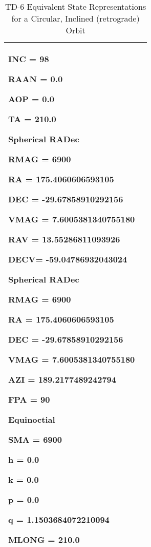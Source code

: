 \begin{table}[htbp!]
\begin{tabular}{|p{1.0 in} |p{5.0 in} |}
\begin{compactenum}
\begin{compactenum}
                  \item INC = 98
                  \item RAAN = 0.0
                  \item AOP = 0.0
                  \item TA = 210.0
              \end{compactenum}
              \item Spherical RADec
               \begin{compactenum}
                  \item RMAG = 6900
                  \item RA = 175.4060606593105
                  \item DEC = -29.67858910292156
                  \item VMAG = 7.6005381340755180
                  \item RAV = 13.55286811093926
                  \item DECV= -59.04786932043024
              \end{compactenum}
              \item Spherical RADec
               \begin{compactenum}
                  \item RMAG = 6900
                  \item RA = 175.4060606593105
                  \item DEC = -29.67858910292156
                  \item VMAG = 7.6005381340755180
                  \item AZI = 189.2177489242794
                  \item FPA = 90
              \end{compactenum}
              \item Equinoctial
               \begin{compactenum}
                  \item SMA = 6900
                  \item h = 0.0
                  \item k = 0.0
                  \item p = 0.0
                  \item q = 1.1503684072210094
                  \item MLONG = 210.0
              \end{compactenum}
          \end{compactenum}\\
         \hline
\end{tabular}
   \label{Table:TD-6}
   \caption{TD-6 Equivalent State Representations for a Circular, Inclined (retrograde) Orbit}
\end{table} 